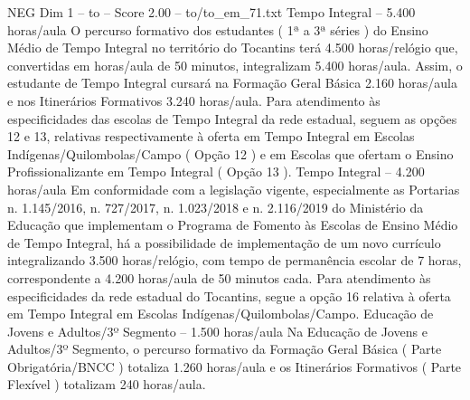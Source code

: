 \begin{textsample}{NEG Dim 1 – to – Score 2.00 – to/to\_em\_71.txt}  \label{ex:f1_neg_034}
Tempo Integral – 5.400 horas/aula O percurso formativo dos estudantes ( 1ª a 3ª séries ) do Ensino Médio de Tempo Integral no território do Tocantins terá 4.500 horas/relógio que, convertidas em horas/aula de 50 minutos, integralizam 5.400 horas/aula.
Assim, o estudante de Tempo Integral cursará na Formação Geral Básica 2.160 horas/aula e nos Itinerários Formativos 3.240 horas/aula.
Para atendimento às especificidades das escolas de Tempo Integral da rede estadual, seguem as opções 12 e 13, relativas respectivamente à oferta em Tempo Integral em Escolas Indígenas/Quilombolas/Campo ( Opção 12 ) e em Escolas que ofertam o Ensino Profissionalizante em Tempo Integral ( Opção 13 ).
Tempo Integral – 4.200 horas/aula Em conformidade com a legislação vigente, especialmente as Portarias n. 1.145/2016, n. 727/2017, n. 1.023/2018 e n. 2.116/2019 do Ministério da Educação que implementam o Programa de Fomento às Escolas de Ensino Médio de Tempo Integral, há a possibilidade de implementação de um novo currículo integralizando 3.500 horas/relógio, com tempo de permanência escolar de 7 horas, correspondente a 4.200 horas/aula de 50 minutos cada.
Para atendimento às especificidades da rede estadual do Tocantins, segue a opção 16 relativa à oferta em Tempo Integral em Escolas Indígenas/Quilombolas/Campo.
Educação de Jovens e Adultos/3º Segmento – 1.500 horas/aula Na Educação de Jovens e Adultos/3º Segmento, o percurso formativo da Formação Geral Básica ( Parte Obrigatória/BNCC ) totaliza 1.260 horas/aula e os Itinerários Formativos ( Parte Flexível ) totalizam 240 horas/aula.

\end{textsample}
